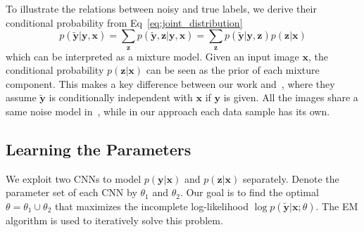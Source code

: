 \documentclass[10pt,twocolumn,letterpaper]{article}
\def\vec{\mathbf}
\begin{document}
To illustrate the relations between noisy and true labels, we derive their conditional probability from Eq~\ref{eq:joint_distribution}
\begin{equation}
    p(\tilde{\vec{y}} | \vec{y}, \vec{x}) = \sum_{\vec{z}} p(\tilde{\vec{y}}, \vec{z} | \vec{y}, \vec{x}) = \sum_{\vec{z}} p(\tilde{\vec{y}} | \vec{y}, \vec{z}) p(\vec{z} | \vec{x})
\end{equation}
which can be interpreted as a mixture model. Given an input image $\vec{x}$, the conditional probability $p(\vec{z} | \vec{x})$ can be seen as the prior of each mixture component. This makes a key difference between our work and~\cite{sukhbaatar2014learning}, where they assume $\tilde{\vec{y}}$ is conditionally independent with $\vec{x}$ if $\vec{y}$ is given. All the images share a same noise model in~\cite{sukhbaatar2014learning}, while in our approach each data sample has its own.

\subsection{Learning the Parameters} %
\label{sub:learning_the_parameters}
We exploit two CNNs to model $p(\vec{y} | \vec{x})$ and $p(\vec{z} | \vec{x})$ separately. Denote the parameter set of each CNN by $\theta_1$ and $\theta_2$. Our goal is to find the optimal $\theta = \theta_1 \cup \theta_2$ that maximizes the incomplete log-likelihood $\log p(\tilde{\vec{y}} | \vec{x}; \theta)$. The EM algorithm is used to iteratively solve this problem.
\end{document}
